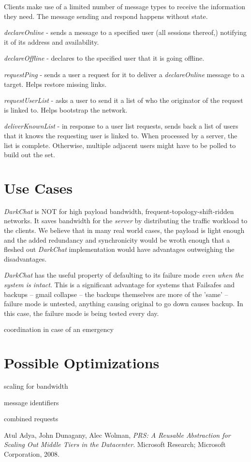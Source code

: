\documentclass[11pt]{article}
\begin{document}
Clients make use of a limited number of message types to receive the information they need. The message sending and respond happens without state.

\begin{description}
\item \emph{declareOnline} - sends a message to a specified user (all sessions thereof,) notifying it of its address and availability.
\item \emph{declareOffline} - declares to the specified user that it is going offline.
\item \emph{requestPing} - sends a user a request for it to deliver a \emph{declareOnline} message to a target. Helps restore missing links.
\item \emph{requestUserList} - asks a user to send it a list of who the originator of the request is linked to. Helps bootstrap the network.
\item \emph{deliverKnownList} - in response to a user list requests, sends back a list of users that it knows the requesting user is linked to. When processed by a server, the list is complete. Otherwise, multiple adjacent users might have to be polled to build out the set.
\end{description}

\section{Use Cases}

\emph{DarkChat} is NOT for high payload bandwidth, frequent-topology-shift-ridden networks. It saves bandwidth for the \emph{server} by distributing the traffic workload to the clients. We believe that in many real world cases, the payload is light enough and the added redundancy and synchronicity would be wroth enough that a fleshed out \emph{DarkChat} implementation would have advantages outweighing the disadvantages.

\emph{DarkChat} has the useful property of defaulting to its failure mode \emph{even when the system is intact}. This is a significant advantage for systems that
Failsafes and backups -- gmail collapse -- the backups themselves are more of the 'same' -- failure mode is untested, anything causing original to go down causes backup.
In this case, the failure mode is being tested every day.

coordination in case of an emergency

\section{Possible Optimizations}
scaling for bandwidth
   
message identifiers
   
combined requests

   
\begin{thebibliography}{1}

    Atul Adya, John Dunagany, Alec Wolman,
    \emph{PRS: A Reusable Abstraction for Scaling Out Middle Tiers in the Datacenter}.
    Microsoft Research; Microsoft Corporation,
    2008.
\end{thebibliography}
\end{document}

